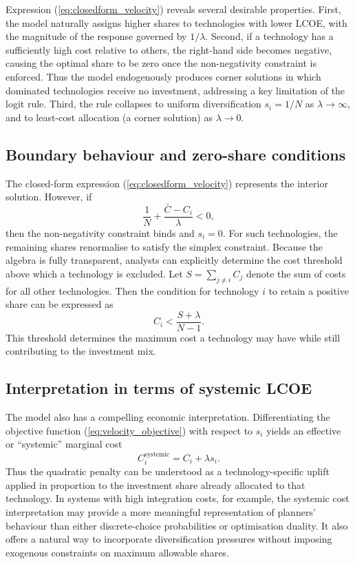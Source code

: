 \documentclass[preprint,authoryear,12pt]{elsarticle}
\begin{document}
Expression (\ref{eq:closedform_velocity}) reveals several desirable properties. First, the model
naturally assigns higher shares to technologies with lower LCOE, with the magnitude of the
response governed by $1/\lambda$. Second, if a technology has a sufficiently high cost relative to
others, the right-hand side becomes negative, causing the optimal share to be zero once the
non-negativity constraint is enforced. Thus the model endogenously produces corner solutions in
which dominated technologies receive no investment, addressing a key limitation of the logit rule.
Third, the rule collapses to uniform diversification $s_i = 1/N$ as $\lambda \rightarrow \infty$,
and to least-cost allocation (a corner solution) as $\lambda \rightarrow 0$.

\subsection{Boundary behaviour and zero-share conditions}

The closed-form expression
(\ref{eq:closedform_velocity}) represents the interior solution. However, if
\begin{equation}
    \frac{1}{N} + \frac{\bar{C} - C_i}{\lambda} < 0,
\end{equation}
then the non-negativity constraint binds and $s_i = 0$. For such technologies, the remaining
shares renormalise to satisfy the simplex constraint. Because the algebra is fully transparent,
analysts can explicitly determine the cost threshold above which a technology is excluded. Let
$S = \sum_{j \ne i} C_j$ denote the sum of costs for all other technologies. Then the condition for
technology $i$ to retain a positive share can be expressed as
\begin{equation}
    C_i < \frac{S + \lambda}{N - 1}.
\end{equation}
This threshold determines the maximum cost a technology may have while still contributing to the
investment mix.

\subsection{Interpretation in terms of systemic LCOE}

The model also has a compelling economic interpretation. Differentiating the objective function
(\ref{eq:velocity_objective}) with respect to $s_i$ yields an effective or ``systemic'' marginal cost
\begin{equation}
    C_i^{\text{systemic}} = C_i + \lambda s_i.
\end{equation}
Thus the quadratic penalty can be understood as a technology-specific uplift applied in
proportion to the investment share already allocated to that technology. In systems with high
integration costs, for example, the systemic cost interpretation may provide a more meaningful
representation of planners' behaviour than either discrete-choice probabilities or optimisation
duality. It also offers a natural way to incorporate diversification pressures without imposing
exogenous constraints on maximum allowable shares.
\end{document}
